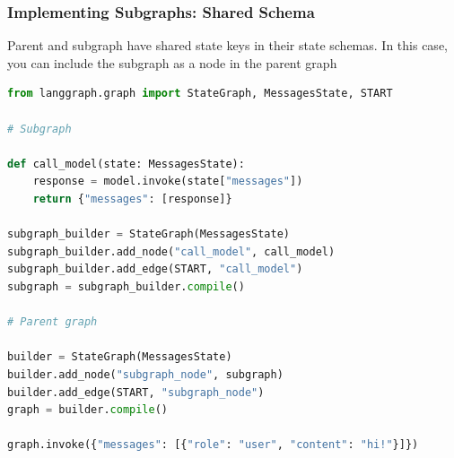 \begin{frame}[fragile]\frametitle{Implementing Subgraphs: Shared Schema}

Parent and subgraph have shared state keys in their state schemas. In this case, you can include the subgraph as a node in the parent graph

\begin{lstlisting}[language=Python, basicstyle=\scriptsize\ttfamily]
from langgraph.graph import StateGraph, MessagesState, START

# Subgraph

def call_model(state: MessagesState):
    response = model.invoke(state["messages"])
    return {"messages": [response]}

subgraph_builder = StateGraph(MessagesState)
subgraph_builder.add_node("call_model", call_model)
subgraph_builder.add_edge(START, "call_model")
subgraph = subgraph_builder.compile()

# Parent graph

builder = StateGraph(MessagesState)
builder.add_node("subgraph_node", subgraph)
builder.add_edge(START, "subgraph_node")
graph = builder.compile()

graph.invoke({"messages": [{"role": "user", "content": "hi!"}]})
      \end{lstlisting}
\end{frame}

